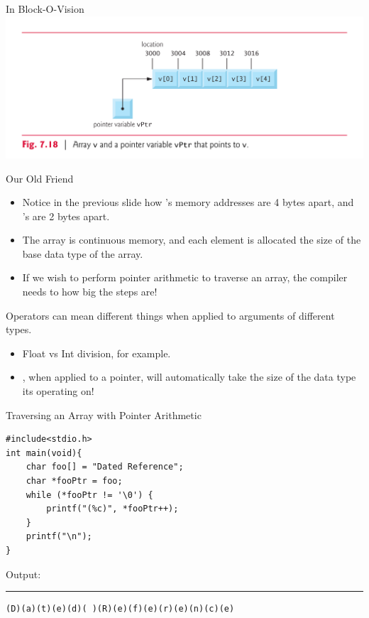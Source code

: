 \documentclass[11pt]{beamer}
\let\OldTexttt\texttt
\renewcommand{\texttt}[1]{\OldTexttt{\color{teal}{#1}}}
\begin{document}
\begin{frame}{In Block-O-Vision}
\center
\includegraphics[scale=0.1]{tbe.png}
\end{frame}

\begin{frame}{Our Old Friend \texttt{++}}
\begin{itemize}
\item Notice in the previous slide how \texttt{foo}'s memory addresses are 4 bytes apart, and \texttt{bar}'s are 2 bytes apart.
\item The array is continuous memory, and each element is allocated the size of the base data type of the array.
\item If we wish to perform pointer arithmetic to traverse an array, the compiler needs to how big the steps are!
\end{itemize}
Operators can mean different things when applied to arguments of different types.
\begin{itemize}
\item Float vs Int division, for example.
\item \texttt{++}, when applied to a pointer, will automatically take the size of the data type its operating on! 
\end{itemize}
\end{frame}

\begin{frame}[fragile=singleslide]{Traversing an Array with Pointer Arithmetic}
\begin{lstlisting}[style=C]
#include<stdio.h>
int main(void){
	char foo[] = "Dated Reference";
	char *fooPtr = foo;
	while (*fooPtr != '\0') {
		printf("(%c)", *fooPtr++);
	} 
	printf("\n");
}
\end{lstlisting}
Output:
\hrule
\begin{verbatim}
(D)(a)(t)(e)(d)( )(R)(e)(f)(e)(r)(e)(n)(c)(e)
\end{verbatim}
\end{frame}
\end{document}
